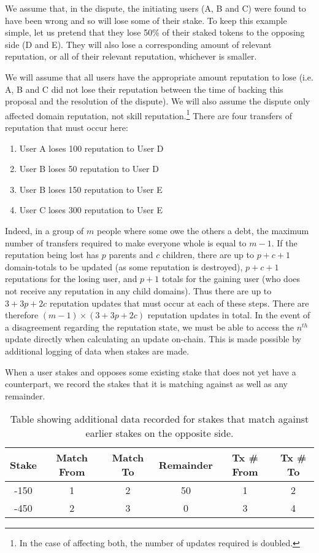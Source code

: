 We assume that, in the dispute, the initiating users (A, B and C) were found to have been wrong and so will lose some of their stake. To keep this example simple, let us pretend that they lose 50\% of their staked tokens to the opposing side (D and E). They will also lose a corresponding amount of relevant reputation, or all of their relevant reputation, whichever is smaller.

We will assume that all users have the appropriate amount reputation to lose (i.e. A, B and C did not lose their reputation between the time of backing this proposal and the resolution of the dispute). We will also assume the dispute only affected domain reputation, not skill reputation.\footnote{In the case of affecting both, the number of updates required is doubled.} There are four transfers of reputation that must occur here:

\begin{enumerate}
\item User A loses 100 reputation to User D
\item User B loses 50 reputation to User D
\item User B loses 150 reputation to User E
\item User C loses 300 reputation to User E
\end{enumerate}

Indeed, in a group of $m$ people where some owe the others a debt, the maximum number of transfers required to make everyone whole is equal to $m-1$. If the reputation being lost has $p$ parents and $c$ children, there are up to $p+c+1$ domain-totals to be updated (as some reputation is destroyed), $p+c+1$ reputations for the losing user, and $p+1$ totals for the gaining user (who does not receive any reputation in any child domains). Thus there are up to $3+3p+2c$ reputation updates that must occur at each of these steps. There are therefore $(m-1)\times(3+3p+2c)$ reputation updates in total. In the event of a disagreement regarding the reputation state, we must be able to access the $n^{th}$ update directly when calculating an update on-chain. This is made possible by additional logging of data when stakes are made.

When a user stakes and opposes some existing stake that does not yet have a counterpart, we record the stakes that it is matching against as well as any remainder.

\begin{table}[ht]
\centering
\caption{Table showing additional data recorded for stakes that match against earlier stakes on the opposite side.}
\begin{tabular}{|c|c|c|c|c|c|}
\hline
Stake & Match From & Match To & Remainder & Tx \# From & Tx \# To\\ \hline
-150  & 1          & 2        & 50      & 1 & 2 \\ \hline
-450  & 2          & 3        & 0       &  3 & 4 \\ \hline
\end{tabular}
\end{table}

